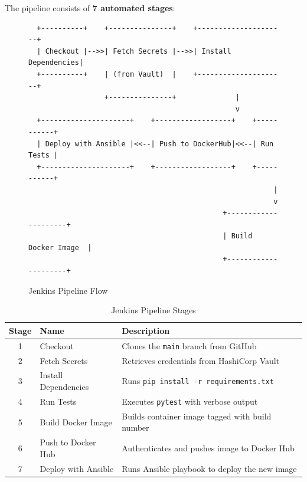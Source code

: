 \documentclass[12pt,a4paper]{article}
\begin{document}
The pipeline consists of \textbf{7 automated stages}:

\begin{figure}[H]
\centering
\begin{verbatim}
  +----------+    +---------------+    +---------------------+
  | Checkout |-->>| Fetch Secrets |-->>| Install Dependencies|
  +----------+    | (from Vault)  |    +---------------------+
                  +---------------+              |
                                                 v
  +---------------------+    +------------------+    +-----------+
  | Deploy with Ansible |<<--| Push to DockerHub|<<--| Run Tests |
  +---------------------+    +------------------+    +-----------+
                                                          |
                                                          v
                                              +---------------------+
                                              | Build Docker Image  |
                                              +---------------------+
\end{verbatim}
\caption{Jenkins Pipeline Flow}
\end{figure}

\begin{table}[H]
\centering
\caption{Jenkins Pipeline Stages}
\begin{tabular}{@{}clp{8cm}@{}}
\toprule
\textbf{Stage} & \textbf{Name} & \textbf{Description} \\
\midrule
1 & Checkout & Clones the \texttt{main} branch from GitHub \\
2 & Fetch Secrets & Retrieves credentials from HashiCorp Vault \\
3 & Install Dependencies & Runs \texttt{pip install -r requirements.txt} \\
4 & Run Tests & Executes \texttt{pytest} with verbose output \\
5 & Build Docker Image & Builds container image tagged with build number \\
6 & Push to Docker Hub & Authenticates and pushes image to Docker Hub \\
7 & Deploy with Ansible & Runs Ansible playbook to deploy the new image \\
\bottomrule
\end{tabular}
\end{table}
\end{document}

